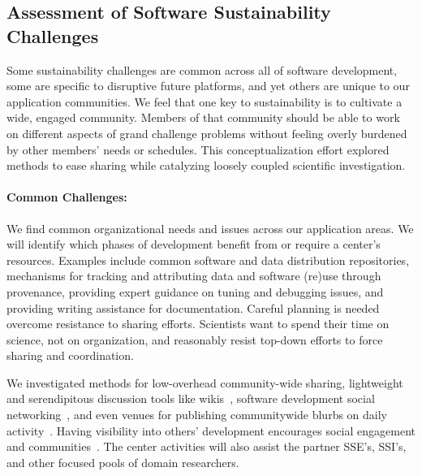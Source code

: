 \subsection{Assessment of Software Sustainability Challenges}
Some sustainability challenges are common across all of software development, some are specific to
disruptive future platforms, and yet others are unique to our application communities. We feel that
one key to sustainability is to cultivate a wide, engaged community. Members of that community
should be able to work on different aspects of grand challenge problems without feeling overly
burdened by other members’ needs or schedules. This conceptualization effort explored methods to 
ease sharing while catalyzing loosely coupled scientific investigation.

\paragraph{Common Challenges:} We find common organizational needs and
issues across our application areas. We will identify which phases of development benefit from
or require a center's resources. Examples include common software and data distribution
repositories, mechanisms for tracking and attributing data and software (re)use through provenance,
providing expert guidance on tuning and debugging issues, and providing writing assistance for
documentation.
Careful planning is needed overcome resistance to sharing efforts. Scientists want to spend their time on
science, not on organization, and reasonably resist top-down efforts to force sharing and coordination.

We investigated methods for low-overhead community-wide sharing, 
lightweight and serendipitous discussion tools like wikis~\cite{ASI:ASI21266,KPM:KPM322},
software development social networking~\cite{5420797,Heller:2011:VCI:1985441.1985476}, 
and even venues for publishing communitywide blurbs on daily activity~\cite{Pagano:2011:DBE:1985441.1985461}. 
Having visibility into others' development encourages social
engagement and communities~\cite{4293573}. 
The center activities will also assist the partner SSE's, SSI's,
and other focused pools of domain researchers. 

